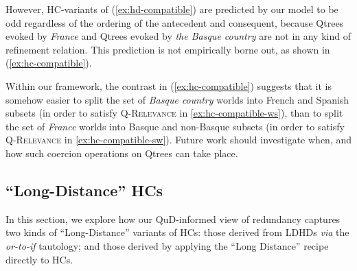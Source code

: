 However, HC-variants of (\ref{ex:hd-compatible}) are predicted by our model to be odd regardless of the ordering of the antecedent and consequent, because Qtrees evoked by \textit{France} and Qtrees evoked by \textit{the Basque country} are not in any kind of refinement relation. This prediction is not empirically borne out, as shown in (\ref{ex:hc-compatible}).

\begin{exe}
\ex \label{ex:hc-compatible}
\begin{xlist}
	\label{ex:hc-compatible-ws}
	\label{ex:hc-compatible-sw}
\end{xlist}
\end{exe}

Within our framework, the contrast in (\ref{ex:hc-compatible}) suggests that it is somehow easier to split the set of \textit{Basque country} worlds into French and Spanish subsets (in order to satisfy \textsc{Q-Relevance} in \ref{ex:hc-compatible-ws}), than to split the set of \textit{France} worlds into Basque and non-Basque subsets (in order to satisfy \textsc{Q-Relevance} in \ref{ex:hc-compatible-sw}). Future work should investigate when, and how such coercion operations on Qtrees can take place.\\





\iffalse
\begin{subfigure}[b]{.33\linewidth}
\centering
\scalebox{.8}{
	\begin{forest}for tree={s sep=7mm, inner sep=0, l=0}
		[CS [{France} [Midi] [~]] [Spain [~] [Navarre]] [...]]
		\node[draw,align=center] at (-.75,-2.3) {Basque\\country};
\end{forest}}
\caption{A tentative Qtree for \textit{Sub will take place in the Basque country}, given principle (\ref{ex:qtree-simplex-def}\ref{pt:simplex-qtree-tiered})}\label{fig:qtree-basque-tiered}
\end{subfigure}
\fi

\subsection{``Long-Distance'' HCs}
In this section, we explore how our QuD-informed view of redundancy captures two kinds of ``Long-Distance'' variants of HCs: those derived from LDHDs \textit{via} the \textit{or-to-if} tautology; and those derived by applying the ``Long Distance'' recipe directly to HCs. 


